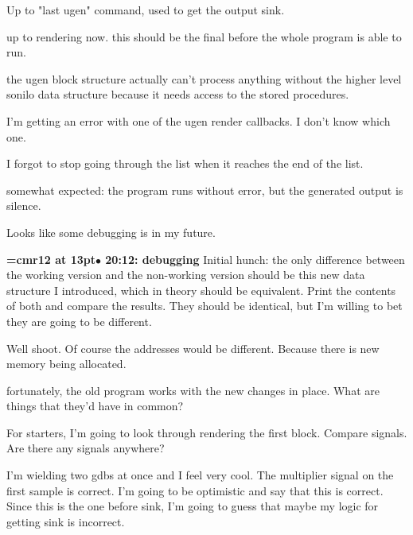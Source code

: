 Up to "last ugen" command, used to get the output sink.
\par

up to rendering now. this should be the final before the whole program is able to run.
\par

the ugen block structure actually can't process anything without the higher level sonilo data structure because it needs access to the stored procedures.
\par

I'm getting an error with one of the ugen render callbacks. I don't know which one.
\par

I forgot to stop going through the list when it reaches the end of the list.
\par

somewhat expected: the program runs without error, but the generated output is silence.
\par

Looks like some debugging is in my future.
\par

{\smallskip\noindent\bf\font\titlefont=cmr12 at 13pt\titlefont $\bullet$ 20:12: debugging}\smallskip
Initial hunch: the only difference between the working version and the non-working version should be this new data structure I introduced, which in theory should be equivalent. Print the contents of both and compare the results. They should be identical, but I'm willing to bet they are going to be different.
\par

Well shoot. Of course the addresses would be different. Because there is new memory being allocated.
\par

fortunately, the old program works with the new changes in place. What are things that they'd have in common?
\par

For starters, I'm going to look through rendering the first block. Compare signals. Are there any signals anywhere?
\par

I'm wielding two gdbs at once and I feel very cool. The multiplier signal on the first sample is correct. I'm going to be optimistic and say that this is correct. Since this is the one before sink, I'm going to guess that maybe my logic for getting sink is incorrect.
\par

